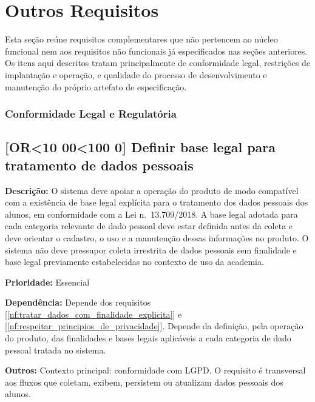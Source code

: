 
\newcommand{\orreqid}{OR\ifnum\value{orreq}<10 00\else\ifnum\value{orreq}<100 0\fi\fi\arabic{orreq}}

\newcommand{\reqoutro}[6]{%
  \refstepcounter{orreq}%
  \subsection{[\orreqid] #2}%
  \label{#1}%
  \noindent\textbf{Descrição:} #3

  \noindent\textbf{Prioridade:} #4

  \noindent\textbf{Dependência:} #5

  \noindent\textbf{Outros:} #6

  \vspace{0.4cm}
}

\section{Outros Requisitos}

Esta seção reúne requisitos complementares que não pertencem ao núcleo funcional nem aos requisitos não funcionais já especificados nas seções anteriores. Os itens aqui descritos tratam principalmente de conformidade legal, restrições de implantação e operação, e qualidade do processo de desenvolvimento e manutenção do próprio artefato de especificação.

\subsubsection*{Conformidade Legal e Regulatória}

\reqoutro
{or:base_legal_lgpd}
{Definir base legal para tratamento de dados pessoais}
{O sistema deve apoiar a operação do produto de modo compatível com a existência de base legal explícita para o tratamento dos dados pessoais dos alunos, em conformidade com a Lei n.\ 13.709/2018. A base legal adotada para cada categoria relevante de dado pessoal deve estar definida antes da coleta e deve orientar o cadastro, o uso e a manutenção dessas informações no produto. O sistema não deve pressupor coleta irrestrita de dados pessoais sem finalidade e base legal previamente estabelecidas no contexto de uso da academia.}
{Essencial}
{Depende dos requisitos [\ref{nf:tratar_dados_com_finalidade_explicita}] e [\ref{nf:respeitar_principios_de_privacidade}]. Depende da definição, pela operação do produto, das finalidades e bases legais aplicáveis a cada categoria de dado pessoal tratada no sistema.}
{Contexto principal: conformidade com LGPD. O requisito é transversal aos fluxos que coletam, exibem, persistem ou atualizam dados pessoais dos alunos.}

